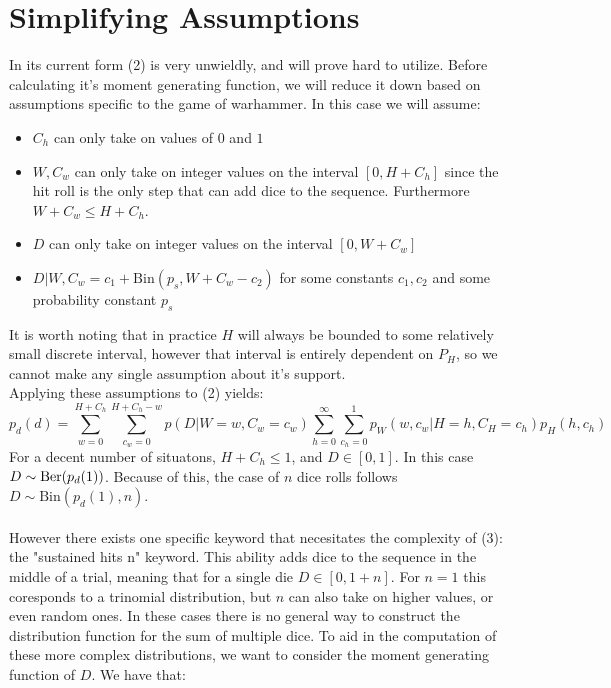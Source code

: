 \documentclass{article}
\begin{document}
\section{Simplifying Assumptions}
In its current form (2) is very unwieldly, and will prove hard to utilize. Before calculating it's moment generating function, we will reduce it down based on assumptions specific to the game of warhammer. In this case we will assume:
\begin{itemize}
    \item $C_h$ can only take on values of $0$ and $1$
    \item $W,C_w$ can only take on integer values on the interval $[0,H + C_h]$ since the hit roll is the only step that can add dice to the sequence. Furthermore $W + C_w \le H + C_h$.
    \item $D$ can only take on integer values on the interval $[0,W+C_w]$
    \item $D|W,C_w = c_1 + \mbox{Bin}(p_s,W+C_w - c_2)$ for some constants $c_1,c_2$ and some probability constant $p_s$
\end{itemize}
It is worth noting that in practice $H$ will always be bounded to some relatively small discrete interval, however that interval is entirely dependent on $P_H$, so we cannot make any single assumption about it's support. \\
Applying these assumptions to (2) yields:
\begin{equation}
        p_d(d) = \sum_{w=0}^{H+C_h} \sum_{c_w = 0}^{H+C_h-w} p(D | W = w, C_w = c_w) \sum_{h=0}^\infty \sum_{c_h=0}^1 p_W(w,c_w | H=h, C_H = c_h) p_H(h,c_h)
\end{equation}
For a decent number of situatons, $H + C_h \le 1$, and $D \in [0,1]$. In this case $D \sim \hbox{Ber}(p_d(1))$. Because of this, the case of $n$ dice rolls follows $D \sim \mbox{Bin}(p_d(1),n)$.\\ \\
However there exists one specific keyword that necesitates the complexity of (3): the "sustained hits n" keyword. This ability adds dice to the sequence in the middle of a trial, meaning that for a single die $D \in [0,1 + n]$. For $n=1$ this coresponds to a trinomial distribution, but $n$ can also take on higher values, or even random ones. In these cases there is no general way to construct the distribution function for the sum of multiple dice. To aid in the computation of these more complex distributions, we want to consider the moment generating function of $D$. We have that:
\end{document}
